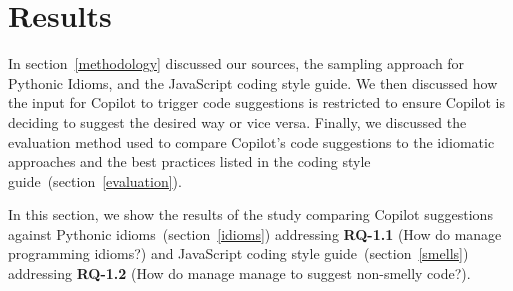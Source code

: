 \section{Results}
\label{results}

In section~\ref{methodology} discussed our sources, the sampling approach for Pythonic Idioms, and the JavaScript coding style guide. 
We then discussed how the input for Copilot to trigger code suggestions is restricted to ensure Copilot is deciding to suggest the desired way or vice versa.
Finally, we discussed the evaluation method used to compare Copilot's code suggestions to the idiomatic approaches and the best practices listed in the coding style guide~(section~\ref{evaluation}).

In this section, we show the results of the study comparing Copilot suggestions against Pythonic idioms~(section~\ref{idioms}) addressing \textbf{RQ-1.1} (How do \cct{} manage programming idioms?) and JavaScript coding style guide~(section~\ref{smells}) addressing \textbf{RQ-1.2} (How do \cct{} manage manage to suggest non-smelly code?).




